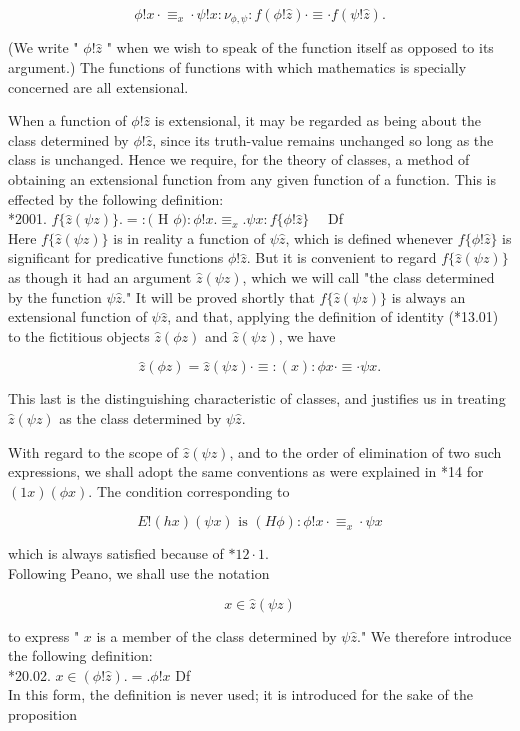 \documentclass[10pt]{article}
\begin{document}
$$
\phi!x \cdot \equiv_{x} \cdot \psi!x: \nu_{\phi, \psi}: f(\phi!\hat{z}) \cdot \equiv \cdot f(\psi!\hat{z}) .
$$

(We write " $\phi!\hat{z}$ " when we wish to speak of the function itself as opposed to its argument.) The functions of functions with which mathematics is specially concerned are all extensional.

When a function of $\phi!\hat{z}$ is extensional, it may be regarded as being about the class determined by $\phi!\hat{z}$, since its truth-value remains unchanged so long as the class is unchanged. Hence we require, for the theory of classes, a method of obtaining an extensional function from any given function of a function. This is effected by the following definition:\\
*2001. $f\{\hat{z}(\psi z)\} .=:($ H $\phi): \phi!x . \equiv_{x} . \psi x: f\{\phi!\hat{z}\} \quad$ Df\\
Here $f\{\hat{z}(\psi z)\}$ is in reality a function of $\psi \hat{z}$, which is defined whenever $f\{\phi!\hat{z}\}$ is significant for predicative functions $\phi!\hat{z}$. But it is convenient to regard $f\{\hat{z}(\psi z)\}$ as though it had an argument $\hat{z}(\psi z)$, which we will call "the class determined by the function $\psi \hat{z}$." It will be proved shortly that $f\{\hat{z}(\psi z)\}$ is always an extensional function of $\psi \hat{z}$, and that, applying the definition of identity (*13.01) to the fictitious objects $\hat{z}(\phi z)$ and $\hat{z}(\psi z)$, we have

$$
\hat{z}(\phi z)=\hat{z}(\psi z) \cdot \equiv:(x): \phi x \cdot \equiv \cdot \psi x .
$$

This last is the distinguishing characteristic of classes, and justifies us in treating $\hat{z}(\psi z)$ as the class determined by $\psi \hat{z}$.

With regard to the scope of $\hat{z}(\psi z)$, and to the order of elimination of two such expressions, we shall adopt the same conventions as were explained in *14 for $(1 x)(\phi x)$. The condition corresponding to

$$
E!(h x)(\psi x) \text { is }(H \phi): \phi!x \cdot \equiv_{x} \cdot \psi x
$$

which is always satisfied because of $* 12 \cdot 1$.\\
Following Peano, we shall use the notation

$$
x \in \hat{z}(\psi z)
$$

to express " $x$ is a member of the class determined by $\psi \hat{z}$." We therefore introduce the following definition:\\
*20.02. $x \in(\phi!\hat{z}) .=. \phi!x$ Df\\
In this form, the definition is never used; it is introduced for the sake of the proposition
\end{document}
